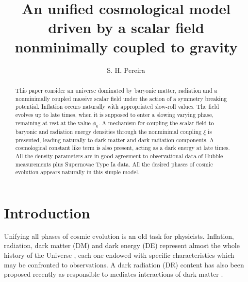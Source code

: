 \documentclass[preprintnumbers,amsmath,amssymb,nofootinbib]{revtex4}
\begin{document}
\title{An unified cosmological model driven by a scalar field\\ nonminimally coupled to gravity}


\author{S. H. Pereira$^{}$}












\begin{abstract}

This paper consider an universe dominated by baryonic matter, radiation and a nonminimally coupled massive scalar field under the action of a symmetry breaking potential. Inflation occurs naturally with appropriated slow-roll values. The field evolves up to late times, when it is supposed to enter a slowing varying phase, remaining at rest at the value $\phi_0$. A mechanism for coupling the scalar field to baryonic and radiation energy densities through the nonminimal coupling $\xi$ is presented, leading naturally to dark matter and dark radiation components. A cosmological constant like term is also present, acting as a dark energy at late times. All the density parameters are in good agreement to observational data of Hubble measurements plus Supernovae Type Ia data. All the desired phases of cosmic evolution appears naturally in this simple model. 

\end{abstract}


\maketitle

\section{Introduction}
Unifying all phases of cosmic evolution is an old task for physicists. Inflation, radiation, dark matter (DM) and dark energy (DE) represent almost the whole history of the Universe \cite{kolb,bookliddle,cosmology}, each one endowed with specific characteristics which may be confronted to observations. A dark radiation (DR) content has also been proposed recently as responsible to mediates interactions of dark matter \cite{darkradiation}.
\end{document}

